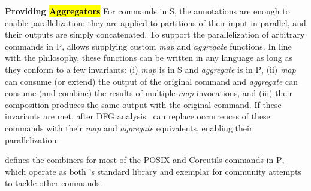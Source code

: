 \documentclass[letterpaper,twocolumn,10pt]{article}
\newcommand{\heading}[1]{\vspace{4pt}\noindent\textbf{#1}\enspace}
\newcommand{\cn}[1]{\mbox{\textcircled{\footnotesize #1}}}
\newcommand{\sta}{\cn{\textsc{S}}\xspace}
\newcommand{\pur}{\cn{\textsc{P}}\xspace}
\newcommand{\todo}[1]{\hl{#1}\xspace}
\newcommand{\nv}[1]{[{\color{cyan}nv: #1}]}
\newcommand{\kk}[1]{[{\color{magenta}kk: #1}]}
\newcommand{\tr}[1]{} %
\begin{document}
\heading{Providing \todo{Aggregators}}
For commands in \sta, the annotations are enough to enable parallelization: they are applied to partitions of their input in parallel, and their outputs are simply concatenated.
%
To support the parallelization of arbitrary commands in \pur, \sys allows supplying custom \emph{map} and \emph{aggregate} functions.
In line with the \unix philosophy, these functions can be written in any language as long as they conform to a few invariants:
  (i) \emph{map} is in \sta and \emph{aggregate} is in \pur,
  (ii) \emph{map} can consume (or extend) the output of the original command and  \emph{aggregate} can consume (and combine) the results of multiple \emph{map} invocations, and
  (iii) their composition produces the same output with the original command.
If these invariants are met, after DFG analysis~ \sys can replace occurrences of these commands with their \emph{map} and \emph{aggregate} equivalents, enabling their parallelization.

\sys defines the combiners for most of the POSIX and Coreutils commands in \pur, which operate as both \sys's standard library and exemplar for community attempts to tackle other commands.


\tr{\kk{I am not sure a general interface is so easy to design. It needs
  more though. It might be beneficial to just talk about sort and wc
  here and how we implemented them and nothing more. Or maybe this
  could then go to the implementation? Or maybe say that one can write
  a python function that given a node of the graph, transforms it into
  many. I am not sure what is best...}}


\tr{Can we find a solution for the commands in coreutils?}
\end{document}
